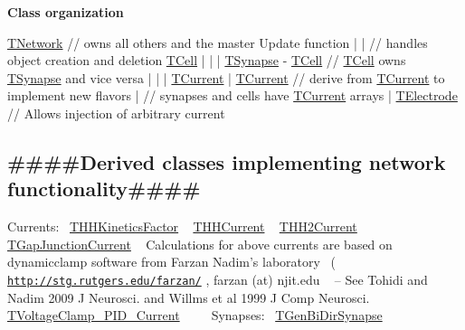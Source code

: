 {\bfseries  Class organization } 
\begin{DoxyPre}
       \hyperlink{class_t_network}{TNetwork}            // owns all others and the master Update function
       |      |            // handles object creation and deletion
     \hyperlink{class_t_cell}{TCell}    |
       |      |
  \hyperlink{class_t_synapse}{TSynapse} - \hyperlink{class_t_cell}{TCell}        // \hyperlink{class_t_cell}{TCell} owns \hyperlink{class_t_synapse}{TSynapse} and vice versa
       |      |  |
    \hyperlink{class_t_current}{TCurrent}  | \hyperlink{class_t_current}{TCurrent}   // derive from \hyperlink{class_t_current}{TCurrent} to implement new flavors
              |            // synapses and cells have \hyperlink{class_t_current}{TCurrent} arrays
              |
           \hyperlink{class_t_electrode}{TElectrode}      // Allows injection of arbitrary current
\end{DoxyPre}
\hypertarget{index_Derived}{}\subsection{\#\#\#\#\+Derived classes implementing network functionality\#\#\#\#}\label{index_Derived}
Currents\+:~\newline
 \hyperlink{class_t_h_h_kinetics_factor}{T\+H\+H\+Kinetics\+Factor} ~\newline
 \hyperlink{class_t_h_h_current}{T\+H\+H\+Current} ~\newline
 \hyperlink{class_t_h_h2_current}{T\+H\+H2\+Current} ~\newline
 \hyperlink{class_t_gap_junction_current}{T\+Gap\+Junction\+Current} ~\newline
 Calculations for above currents are based on dynamicclamp software from Farzan Nadim's laboratory~\newline
 ( \href{http://stg.rutgers.edu/farzan/}{\tt http\+://stg.\+rutgers.\+edu/farzan/} , farzan (at) njit.\+edu ~\newline
 -- See Tohidi and Nadim 2009 J Neurosci. and Willms et al 1999 J Comp Neurosci. ~\newline
~\newline
 \hyperlink{class_t_voltage_clamp___p_i_d___current}{T\+Voltage\+Clamp\+\_\+\+P\+I\+D\+\_\+\+Current}~\newline
 ~\newline
 ~\newline
 Synapses\+:~\newline
 \hyperlink{class_t_gen_bi_dir_synapse}{T\+Gen\+Bi\+Dir\+Synapse} ~\newline
